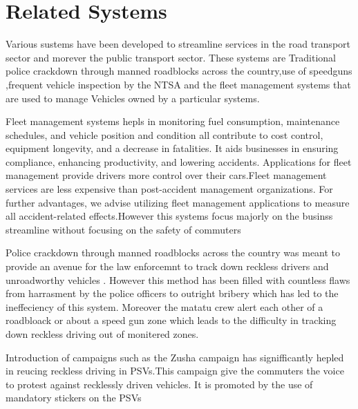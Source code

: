 \documentclass[a4paper, 12pt]{report}
\begin{document}
\section{Related Systems}
\noindent Various sustems have been developed to streamline services in the road transport sector and morever the public transport sector. These systems are Traditional police crackdown through manned roadblocks across the country,use of speedguns ,frequent vehicle inspection by the NTSA and the fleet management systems that are used to manage Vehicles owned by a particular systems.\par
\noindent Fleet management systems hepls in monitoring fuel consumption, maintenance schedules, and vehicle position and condition all contribute to cost control, equipment longevity, and a decrease in fatalities. It aids businesses in ensuring compliance, enhancing productivity, and lowering accidents. Applications for fleet management provide drivers more control over their cars.Fleet management services are less expensive than post-accident management organizations. For further advantages, we advise utilizing fleet management applications to measure all accident-related effects.However this systems focus majorly on the businss streamline without focusing on the safety of commuters \par
\noindent Police crackdown through manned roadblocks across the country was meant to
provide an avenue for the law enforcemnt to track down reckless drivers and unroadworthy vehicles . However this method has been filled with countless flaws
from harrasment by the police officers to outright bribery which has led to the
ineffeciency of this system. Moreover the matatu crew alert each other of a roadbloack or about a speed gun zone which leads to the difficulty in tracking down
reckless driving out of monitered zones.\par 
\noindent Introduction of campaigns such as the Zusha campaign has signifficantly hepled in
reucing reckless driving in PSVs.This campaign give the commuters the voice to
protest against recklessly driven vehicles. It is promoted by the use of mandatory
stickers on the PSVs
\end{document}
